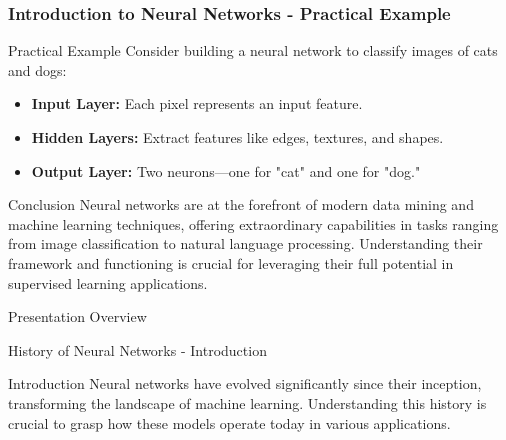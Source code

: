 \documentclass[aspectratio=169]{beamer}
\begin{document}
\begin{frame}[fragile]
    \frametitle{Introduction to Neural Networks - Practical Example}
    \begin{block}{Practical Example}
        Consider building a neural network to classify images of cats and dogs:
        \begin{itemize}
            \item \textbf{Input Layer:} Each pixel represents an input feature.
            \item \textbf{Hidden Layers:} Extract features like edges, textures, and shapes.
            \item \textbf{Output Layer:} Two neurons—one for "cat" and one for "dog."
        \end{itemize}
    \end{block}

    \begin{block}{Conclusion}
        Neural networks are at the forefront of modern data mining and machine learning techniques, offering extraordinary capabilities in tasks ranging from image classification to natural language processing. Understanding their framework and functioning is crucial for leveraging their full potential in supervised learning applications.
    \end{block}
\end{frame}

\begin{frame}[fragile]{Presentation Overview}
  \tableofcontents[hideallsubsections]
\end{frame}

\begin{frame}[fragile]{History of Neural Networks - Introduction}
    \begin{block}{Introduction}
        Neural networks have evolved significantly since their inception, transforming the landscape of machine learning. Understanding this history is crucial to grasp how these models operate today in various applications.
    \end{block}
\end{frame}
\end{document}
